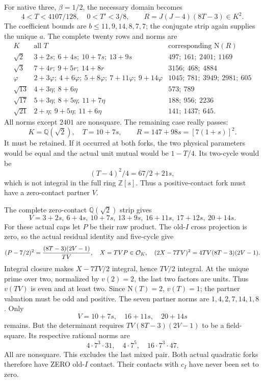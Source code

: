For native three, \(\beta=1/2\),
the necessary domain becomes
\[
 4<T<4107/128,\quad0<T'<3/8,\qquad
                         R=J(J-4)(8T-3)\in K^2 .
\]
The coefficient bounds are
\(b\le11,9,14,8,7,7\); the conjugate
strip again supplies the unique \(a\).
The complete twenty rows and norms are
\[
\begin{array}{c|l|l}
 K&\text{all }T&\text{corresponding }\mathrm N(R)\\ \hline
 \sqrt2&3+2s;\ 6+4s;\ 10+7s;\ 13+9s&497;\ 161;\ 2401;\ 1169\\
 \sqrt3&7+4r;\ 9+5r;\ 14+8r&3156;\ 468;\ 4884\\
 \varphi&2+3\varphi;\ 4+6\varphi;\ 5+8\varphi;\
             7+11\varphi;\ 9+14\varphi&1045;\ 781;\ 3949;\ 2981;\ 605\\
 \sqrt{13}&4+3\eta;\ 8+6\eta&573;\ 789\\
 \sqrt{17}&5+3\eta;\ 8+5\eta;\ 11+7\eta&188;\ 956;\ 2236\\
 \sqrt{21}&2+\eta;\ 9+5\eta;\ 11+6\eta&141;\ 1437;\ 645 .
\end{array}
\]
All norms except \(2401\) are
nonsquare.
The remaining case really passes:
\[
              K=\mathbb Q(\sqrt2),\quad T=10+7s,\qquad
                 R=147+98s=[7(1+s)]^2 .
\]
It must be retained.
If it occurred at both forks,
the two physical parameters would
be equal and the actual unit mutual
would be \(1-T/4\).
Its two-cycle would be
\[
                        (T-4)^2/4=67/2+21s,
\]
which is not integral in the full
ring \(\mathbb Z[s]\).
Thus a positive-contact fork must
have a zero-contact partner \(V\).

The complete zero-contact
\(\mathbb Q(\sqrt2)\) strip gives
\[
 V=3+2s,\ 6+4s,\ 10+7s,\ 13+9s,\
                        16+11s,\ 17+12s,\ 20+14s .
\]
For these actual caps let \(P\)
be their raw product.
The old-\(I\) cross projection is
zero, so the actual residual identity
and five-cycle give
\[
 (P-7/2)^2={(8T-3)(2V-1)\over TV},\quad
 X=TVP\in\mathcal O_K,\quad
                (2X-7TV)^2=4TV(8T-3)(2V-1).
\]
Integral closure makes
\(X-7TV/2\) integral, hence \(TV/2\)
integral.
At the unique prime over two,
normalized by \(v(2)=2\), the last
two factors are units.
Thus \(v(TV)\) is even and at least
two.
Since \(\mathrm N(T)=2\), \(v(T)=1\);
the partner valuation must be odd
and positive.
The seven partner norms are
\(1,4,2,7,14,1,8\).
Only
\[
                         V=10+7s,\quad16+11s,\quad20+14s
\]
remains.
But the determinant requires
\(TV(8T-3)(2V-1)\) to be a field-square.
Its respective rational norms are
\[
                           4\cdot7^3\cdot31,\quad
                           4\cdot7^5,\quad
                           16\cdot7^3\cdot47 .
\]
All are nonsquare.
This excludes the last mixed pair.
Both actual quadratic forks
therefore have ZERO old-\(I\) contact.
Their contacts with \(c_I\) have
never been set to zero.

